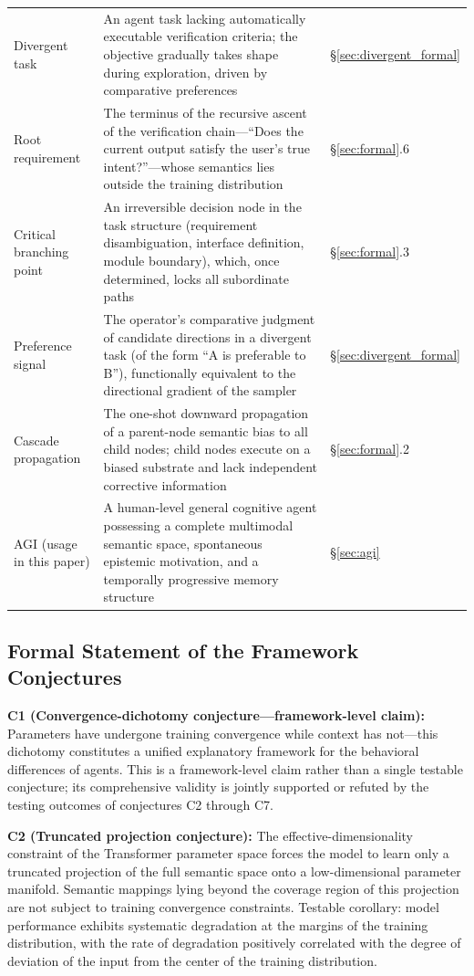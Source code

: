 \documentclass[11pt,a4paper]{article}
\theoremstyle{definition}
\begin{document}
\begin{table}[H]
\begin{tabular}{@{}p{2.8cm}p{5.2cm}p{4cm}@{}}
Divergent task & An agent task lacking automatically executable verification criteria; the objective gradually takes shape during exploration, driven by comparative preferences & \S\ref{sec:divergent_formal} \\
Root requirement & The terminus of the recursive ascent of the verification chain---``Does the current output satisfy the user's true intent?''---whose semantics lies outside the training distribution & \S\ref{sec:formal}.6 \\
Critical branching point & An irreversible decision node in the task structure (requirement disambiguation, interface definition, module boundary), which, once determined, locks all subordinate paths & \S\ref{sec:formal}.3 \\
Preference signal & The operator's comparative judgment of candidate directions in a divergent task (of the form ``A is preferable to B''), functionally equivalent to the directional gradient of the sampler & \S\ref{sec:divergent_formal} \\
Cascade propagation & The one-shot downward propagation of a parent-node semantic bias to all child nodes; child nodes execute on a biased substrate and lack independent corrective information & \S\ref{sec:formal}.2 \\
AGI (usage in this paper) & A human-level general cognitive agent possessing a complete multimodal semantic space, spontaneous epistemic motivation, and a temporally progressive memory structure & \S\ref{sec:agi} \\
\bottomrule
\end{tabular}
\end{table}

\subsection{Formal Statement of the Framework Conjectures}

\textbf{C1 (Convergence-dichotomy conjecture---framework-level claim):}
Parameters have undergone training convergence while context has not---this dichotomy constitutes a unified explanatory framework for the behavioral differences of agents. This is a framework-level claim rather than a single testable conjecture; its comprehensive validity is jointly supported or refuted by the testing outcomes of conjectures C2 through C7.

\textbf{C2 (Truncated projection conjecture):}
The effective-dimensionality constraint of the Transformer parameter space forces the model to learn only a truncated projection of the full semantic space onto a low-dimensional parameter manifold. Semantic mappings lying beyond the coverage region of this projection are not subject to training convergence constraints. Testable corollary: model performance exhibits systematic degradation at the margins of the training distribution, with the rate of degradation positively correlated with the degree of deviation of the input from the center of the training distribution.
\end{document}
